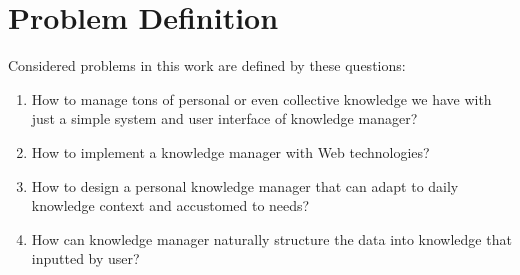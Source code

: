 \section{Problem Definition}
\label{sec:problem-definition}

Considered problems in this work are defined by these questions:

\begin{enumerate}
\item How to manage tons of personal or even collective knowledge we have with just a simple system and user interface of knowledge manager?
\item How to implement a knowledge manager with Web technologies?
\item How to design a personal knowledge manager that can adapt to daily knowledge context and accustomed to needs?
\item How can knowledge manager naturally structure the data into knowledge that inputted by user?
\end{enumerate}


